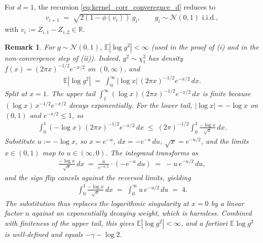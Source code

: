 \documentclass[10pt,a4paper]{amsart}
\newtheorem{remark}{Remark}
\newcommand{\Exp}[1]{\mathbb{E} #1}
\newcommand{\RR}{\mathbb{R}}
\newcommand{\mcN}{\mathcal{N}}
\begin{document}
For $d = 1$, the recursion \eqref{eq:kernel_corr_converegnce_d} reduces to
\begin{eqnarray}
  \label{eq:kernel_corr_converegnce}
  v_{i+1} \;=\; \sqrt{2(1 - \phi(v_i))}\, g_i, \qquad g_i \sim \mcN(0, 1) \text{ i.i.d.},
\end{eqnarray}
with $v_i := Z_{i,1} - Z_{i,2} \in \RR$.

\begin{remark}
  \label{rem:log_g_sq_integrable}
  For $g \sim \mcN(0, 1)$, $\Exp{|\log g^2|} < \infty$ (used in the proof of (i) and in the non-convergence step of (ii)). Indeed, $g^2 \sim \chi^2_1$ has density $f(x) = (2\pi x)^{-1/2} e^{-x/2}$ on $(0, \infty)$, and
  \begin{eqnarray*}
    \Exp{|\log g^2|} \;=\; \int_0^\infty |\log x|\,(2\pi x)^{-1/2} e^{-x/2}\,dx.
  \end{eqnarray*}
  Split at $x = 1$. The upper tail $\int_1^\infty (\log x)(2\pi x)^{-1/2} e^{-x/2}\,dx$ is finite because $(\log x)\,x^{-1/2} e^{-x/2}$ decays exponentially. For the lower tail, $|\log x| = -\log x$ on $(0,1)$ and $e^{-x/2} \le 1$, so
  \begin{eqnarray*}
    \int_0^1 (-\log x)\,(2\pi x)^{-1/2} e^{-x/2}\,dx \;\le\; (2\pi)^{-1/2}\!\int_0^1 \frac{-\log x}{\sqrt{x}}\,dx.
  \end{eqnarray*}
  Substitute $u := -\log x$, so $x = e^{-u}$, $dx = -e^{-u}\,du$, $\sqrt{x} = e^{-u/2}$, and the limits $x \in (0,1)$ map to $u \in (\infty, 0)$. The integrand transforms as
  \begin{eqnarray*}
    \frac{-\log x}{\sqrt{x}}\,dx \;=\; \frac{u}{e^{-u/2}}\cdot(-e^{-u}\,du) \;=\; -u\,e^{-u/2}\,du,
  \end{eqnarray*}
  and the sign flip cancels against the reversed limits, yielding
  \begin{eqnarray*}
    \int_0^1\frac{-\log x}{\sqrt{x}}\,dx \;=\; \int_0^\infty u\,e^{-u/2}\,du \;=\; 4.
  \end{eqnarray*}
  The substitution thus replaces the logarithmic singularity at $x = 0$ by a linear factor $u$ against an exponentially decaying weight, which is harmless. Combined with finiteness of the upper tail, this gives $\Exp{|\log g^2|} < \infty$, and a fortiori $\Exp{\log g^2}$ is well-defined and equals $-\gamma - \log 2$.
\end{remark}
\end{document}
